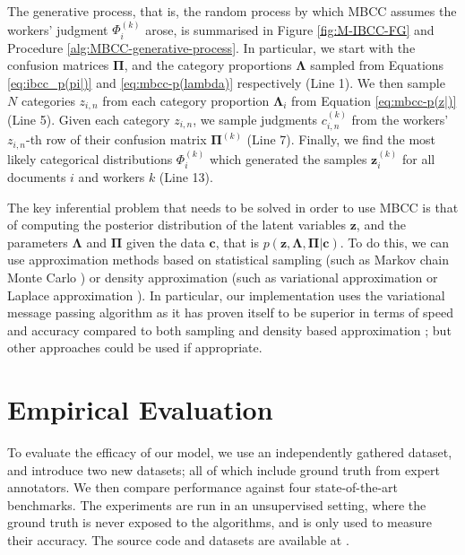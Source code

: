 \documentclass{article}
\begin{document}
The generative process, that is, the random process by which MBCC
assumes the workers' judgment $\Phi_{i}^{(k)}$ arose, is summarised
in Figure \ref{fig:M-IBCC-FG} and Procedure \ref{alg:MBCC-generative-process}. In particular, we start
with the confusion matrices $\boldsymbol{\Pi}$, and the category
proportions $\boldsymbol{\Lambda}$ sampled from Equations \ref{eq:ibcc_p(pi|)}
and \ref{eq:mbcc-p(lambda)} respectively (Line 1). We then sample
$N$ categories $z_{i,n}$ from each category proportion $\boldsymbol{\Lambda}_{i}$
from Equation \ref{eq:mbcc-p(z|)} (Line 5). Given each category
$z_{i,n}$, we sample judgments $c_{i,n}^{(k)}$ from the workers'
$z_{i,n}$-th row of their confusion matrix $\boldsymbol{\Pi}^{(k)}$
(Line 7). Finally, we find the most likely categorical distributions
$\Phi_{i}^{(k)}$ which generated the samples $\mathbf{z}_{i}^{(k)}$
for all documents $i$ and workers $k$ (Line 13).





The key inferential problem that needs to be solved in order to use
MBCC is that of computing the posterior distribution of the latent
variables $\mathbf{z}$, and the parameters $\boldsymbol{\Lambda}$
and $\boldsymbol{\Pi}$ given the data $\mathbf{c}$, that is $p\left(\mathbf{z},\boldsymbol{\Lambda},\boldsymbol{\Pi}|\mathbf{c}\right)$.
 To do this, we can use approximation methods based on statistical
sampling (such as Markov chain Monte Carlo \cite{geman_stochastic_1984})
or density approximation (such as variational approximation \cite{jordan_introduction_1999,Attias00avariational}
or Laplace approximation \cite{laplace1986}). In particular, our
implementation uses the variational\emph{ }message passing algorithm
\cite{winn_variational_2005} as it has proven itself to be superior
in terms of speed and accuracy compared to both sampling and density
based approximation \cite{minka_expectation_2013}; but other approaches
could be used if appropriate. 


\section{Empirical Evaluation}

\label{sec:Empirical-Evaluation}

To evaluate the efficacy of our model, we use an independently gathered
dataset, and introduce two new datasets; all of which include ground
truth from expert annotators. We then compare performance against
four state-of-the-art benchmarks. The experiments are run in an
unsupervised setting, where the ground truth is never exposed to
the algorithms, and is only used to measure their accuracy. 
The source code and datasets are available at \cite{augustin_mbcc_2017}.
\end{document}
